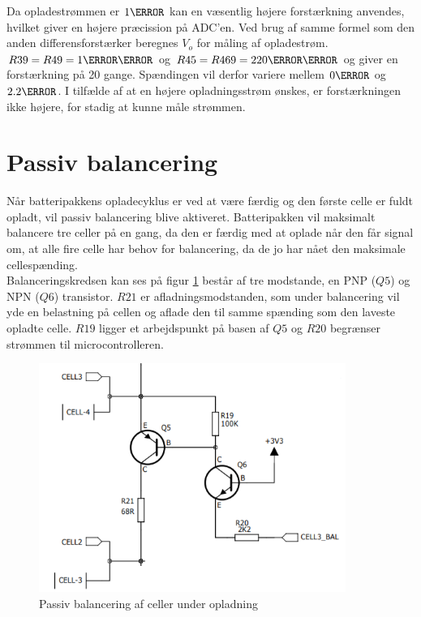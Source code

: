 Da opladestrømmen er $1\ampere$ kan en væsentlig højere forstærkning anvendes, hvilket giver en højere præcission på ADC'en. Ved brug af samme formel som den anden differensforstærker beregnes $V_{o}$ for måling af opladestrøm. $R39 = R49 = 1\kilo\ohm$ og $R45 = R469 = 220\kilo\ohm$ og giver en forstærkning på 20 gange. Spændingen vil derfor variere mellem $0\volt$ og $2.2\volt$. I tilfælde af at en højere opladningsstrøm ønskes, er forstærkningen ikke højere, for stadig at kunne måle strømmen.


\section{Passiv balancering}\label{afs:balancing}
Når batteripakkens opladecyklus er ved at være færdig og den første celle er fuldt opladt, vil passiv balancering blive aktiveret. Batteripakken vil maksimalt balancere tre celler på en gang, da den er færdig med at oplade når den får signal om, at alle fire celle har behov for balancering, da de jo har nået den maksimale cellespænding.
\\

Balanceringskredsen kan ses på figur \ref{fig:passiv_balancering} består af tre modstande, en PNP ($Q5$) og NPN ($Q6$) transistor. $R21$ er afladningsmodstanden, som under balancering vil yde en belastning på cellen og aflade den til samme spænding som den laveste opladte celle. $R19$ ligger et arbejdspunkt på basen af $Q5$ og $R20$ begrænser strømmen til microcontrolleren. 
\\

\begin{figure}[h]
	\centering
	\includegraphics[width=10cm]{billeder/balance.png}
	\caption{Passiv balancering af celler under opladning}
	\label{fig:passiv_balancering}
\end{figure}

